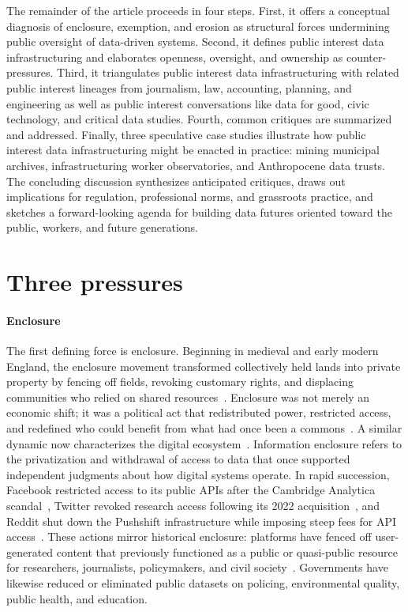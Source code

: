\documentclass[acmsmall,screen]{acmart}
\begin{document}
The remainder of the article proceeds in four steps. First, it offers a conceptual diagnosis of enclosure, exemption, and erosion as structural forces undermining public oversight of data-driven systems. Second, it defines public interest data infrastructuring and elaborates openness, oversight, and ownership as counter-pressures. Third, it triangulates public interest data infrastructuring with related public interest lineages from journalism, law, accounting, planning, and engineering as well as public interest conversations like data for good, civic technology, and critical data studies. Fourth, common critiques are summarized and addressed. Finally, three speculative case studies illustrate how public interest data infrastructuring might be enacted in practice: mining municipal archives, infrastructuring worker observatories, and Anthropocene data trusts. The concluding discussion synthesizes anticipated critiques, draws out implications for regulation, professional norms, and grassroots practice, and sketches a forward-looking agenda for building data futures oriented toward the public, workers, and future generations.

\section*{Three pressures}

\paragraph*{Enclosure}
The first defining force is enclosure. Beginning in medieval and early modern England, the enclosure movement transformed collectively held lands into private property by fencing off fields, revoking customary rights, and displacing communities who relied on shared resources~\cite{boyle2017second}. Enclosure was not merely an economic shift; it was a political act that redistributed power, restricted access, and redefined who could benefit from what had once been a commons~\cite{hess2003ideas}. A similar dynamic now characterizes the digital ecosystem~\cite{boyle2017second,hess2003ideas,wu_PlatformEnclosureHuman_2021}. Information enclosure refers to the privatization and withdrawal of access to data that once supported independent judgments about how digital systems operate. In rapid succession, Facebook restricted access to its public APIs after the Cambridge Analytica scandal~\cite{confessore_cambridge_2018,van_der_vlist_api_2022}, Twitter revoked research access following its 2022 acquisition~\cite{han_what_2024,stokel-walker_under_2024}, and Reddit shut down the Pushshift infrastructure while imposing steep fees for API access~\cite{isaac_RedditWantsGet_2023,lift_ticket83_RedditDataAPI_2023}. These actions mirror historical enclosure: platforms have fenced off user-generated content that previously functioned as a public or quasi-public resource for researchers, journalists, policymakers, and civil society~\cite{Freelon_ComputationalResearchPostAPI_2018,Bruns_APIcalypsesocialmedia_2019,wu_PlatformEnclosureHuman_2021}. Governments have likewise reduced or eliminated public datasets on policing, environmental quality, public health, and education.
\end{document}
